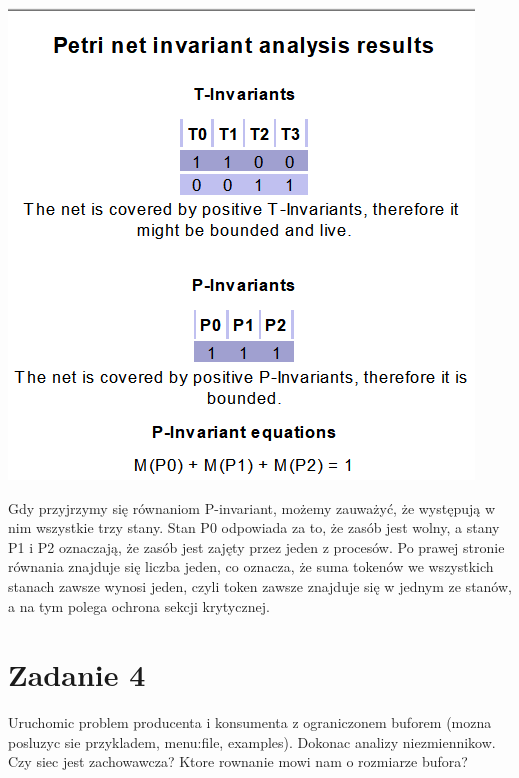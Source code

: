 \documentclass[12pt]{article}
\begin{document}
\begin{center}
\centering
    \includegraphics{zad3_invariant.png}
\end{center}

Gdy przyjrzymy się równaniom P-invariant, możemy zauważyć, że występują w nim wszystkie trzy stany. Stan P0 odpowiada za to, że zasób jest wolny, a stany P1 i P2 oznaczają, że zasób jest zajęty przez jeden z procesów. Po prawej stronie równania znajduje się liczba jeden, co oznacza, że suma tokenów we wszystkich stanach zawsze wynosi jeden, czyli token zawsze znajduje się w jednym ze stanów, a na tym polega ochrona sekcji krytycznej.

\section{Zadanie 4}
Uruchomic problem producenta i konsumenta z ograniczonem buforem (mozna posluzyc sie przykladem, menu:file, examples). Dokonac analizy niezmiennikow. Czy siec jest zachowawcza? Ktore rownanie mowi nam o rozmiarze bufora?
\end{document}
